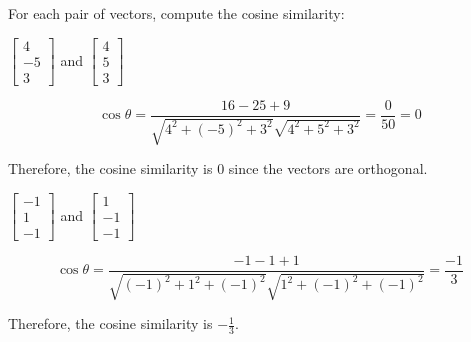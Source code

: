 \documentclass{article}
\begin{document}
\begin{probset}
\begin{prob}
    For each pair of vectors, compute the cosine similarity:
    \begin{subprobset}
        \begin{subprob}
            $\begin{bmatrix} 4 \\ -5 \\ 3 \end{bmatrix}$ and $\begin{bmatrix} 4 \\ 5 \\ 3 \end{bmatrix}$

            \begin{soln}
                \[\cos \theta = \frac{16 - 25 + 9}{\sqrt{4^2 + (-5)^2 + 3^2} \sqrt{4^2 + 5^2 + 3^2}} = \frac{0}{50} = 0\]

                Therefore, the cosine similarity is 0 since the vectors are orthogonal.
            \end{soln}
        \end{subprob}

        \begin{subprob}
            $\begin{bmatrix} -1 \\ 1 \\ -1 \end{bmatrix}$ and $\begin{bmatrix} 1 \\ -1 \\ -1 \end{bmatrix}$

            \begin{soln}
                \[\cos \theta = \frac{-1 - 1 + 1}{\sqrt{(-1)^2 + 1^2 + (-1)^2} \sqrt{1^2 + (-1)^2 + (-1)^2}} = \frac{-1}{3}\]

                Therefore, the cosine similarity is $-\frac{1}{3}$.
            \end{soln}
        \end{subprob}
    \end{subprobset}
\end{prob}
\end{probset}
\end{document}
